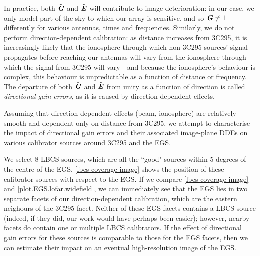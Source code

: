 \pg
In practice, both $\tilde{\textbf{\emph{G}}}$ and $\tilde{\textbf{\emph{E}}}$ will contribute to image deterioration: in our case, we only model part of the sky to which our array is sensitive, and so $\tilde{\textbf{\emph{G}}}\ne 1$ differently for various antennas, times and frequencies. Similarly, we do not perform direction-dependent calibration: as distance increases from 3C295, it is increasingly likely that the ionosphere through which non-3C295 sources' signal propagates before reaching our antennas will vary from the ionosphere through which the signal from 3C295 will vary - and because the ionosphere's behaviour is complex, this behaviour is unpredictable as a function of distance or frequency. The departure of both $\tilde{\textbf{\emph{G}}}$ and $\tilde{\textbf{\emph{E}}}$ from unity as a function of direction is called \textit{directional gain errors}, as it is caused by direction-dependent effects. 

\pg
Assuming that direction-dependent effects (beam, ionosphere) are relatively smooth and dependent only on distance from 3C295, we attempt to characterise the impact of directional gain errors and their associated image-plane DDEs on various calibrator sources around 3C295 and the EGS. 

\pg
We select 8 LBCS sources, which are all the ``good" sources within 5 degrees of the centre of the EGS. \cref{lbcs-coverage-image} shows the position of these calibrator sources with respect to the EGS. If we compare \cref{lbcs-coverage-image} and \cref{plot.EGS.lofar.widefield}, we can immediately see that the EGS lies in two separate facets of our direction-dependent calibration, which are the eastern neighours of the 3C295 facet. Neither of these EGS facets contains a LBCS source (indeed, if they did, our work would have perhaps been easier); however, nearby facets do contain one or multiple LBCS calibrators. If the effect of directional gain errors for these sources is comparable to those for the EGS facets, then we can estimate their impact on an eventual high-resolution image of the EGS. 





